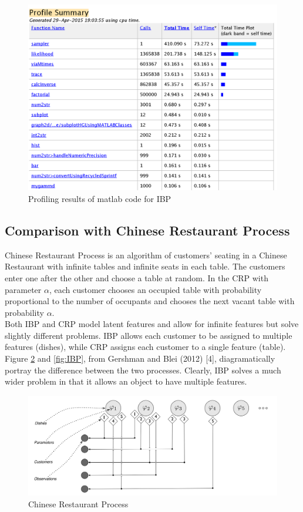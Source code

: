 \documentclass[11pt]{article}
\begin{document}
\begin{figure}
\includegraphics[width=\linewidth]{matlab_profile.png}
\caption {Profiling results of matlab code for IBP}
\label{fig:matlab}
\end{figure}

\subsection{Comparison with Chinese Restaurant Process}
Chinese Restaurant Process is an algorithm of customers’ seating in a Chinese Restaurant with infinite tables and infinite seats in each table. The customers enter one after the other and choose a table at random. In the CRP with parameter $\alpha$, each customer chooses an occupied table with probability proportional to the number of occupants and chooses the next vacant table with probability $\alpha$.\\

Both IBP and CRP model latent features and allow for infinite features but solve slightly different problems. IBP allows each customer to be assigned to multiple features (dishes), while
CRP assigns each customer to a single feature (table). Figure \ref{fig:CRP} and \ref{fig:IBP}, from Gershman and Blei (2012) [4], diagramatically portray the difference between the two processes. Clearly, IBP solves a much wider problem in that it allows an object to have multiple features.

\begin{figure}
\includegraphics[width=\linewidth]{CRP.png}
\caption {Chinese Restaurant Process}
\label{fig:CRP}
\end{figure}
\end{document}
